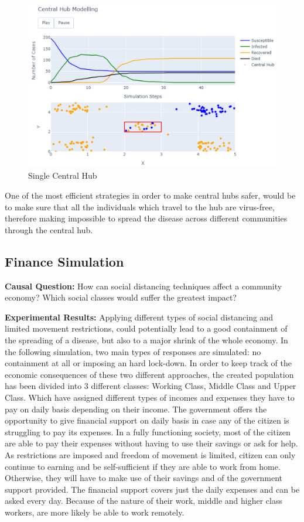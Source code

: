 \begin{figure}[ht!]%
    \centering
    \includegraphics[width=0.85\linewidth]{latex/images/hubs1.pdf}
    \caption{Single Central Hub}
    \label{hub}
\end{figure}

One of the most efficient strategies in order to make central hubs safer, would be to make sure that all the individuals which travel to the hub are virus-free, therefore making impossible to spread the disease across different communities through the central hub.

\subsection{Finance Simulation}

\textbf{Causal Question:} How can social distancing techniques affect a community economy? Which social classes would suffer the greatest impact?

\textbf{Experimental Results:} Applying different types of social distancing and limited movement restrictions, could potentially lead to a good containment of the spreading of a disease, but also to a major shrink of the whole economy. In the following simulation, two main types of responses are simulated: no containment at all or imposing an hard lock-down. In order to keep track of the economic consequences of these two different approaches, the created population has been divided into 3 different classes: Working Class, Middle Class and Upper Class. Which have assigned different types of incomes and expenses they have to pay on daily basis depending on their income. The government offers the opportunity to give financial support on daily basis in case any of the citizen is struggling to pay its expenses. In a fully functioning society, most of the citizen are able to pay their expenses without having to use their savings or ask for help. As restrictions are imposed and freedom of movement is limited, citizen can only continue to earning and be self-sufficient if they are able to work from home. Otherwise, they will have to make use of their savings and of the government support provided. The financial support covers just the daily expenses and can be asked every day. Because of the nature of their work, middle and higher class workers, are more likely be able to work remotely.

